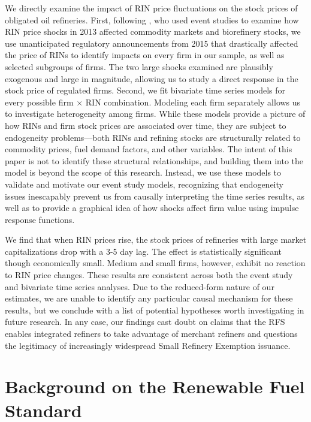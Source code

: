 \documentclass[11pt]{article}
\begin{document}
We directly examine the impact of RIN price fluctuations on the stock prices of obligated oil refineries. First, following \cite{Lade2018a}, who used event studies to examine how RIN price shocks in 2013 affected commodity markets and biorefinery stocks, we use unanticipated regulatory announcements from 2015 that drastically affected the price of RINs to identify impacts on every firm in our sample, as well as selected subgroups of firms. The two large shocks examined are plausibly exogenous and large in magnitude, allowing us to study a direct response in the stock price of regulated firms. Second, we fit bivariate time series models for every possible firm $\times$ RIN combination. Modeling each firm separately allows us to investigate heterogeneity among firms. While these models provide a picture of how RINs and firm stock prices are associated over time, they are subject to endogeneity problems---both RINs and refining stocks are structurally related to commodity prices, fuel demand factors, and other variables. The intent of this paper is not to identify these structural relationships, and building them into the model is beyond the scope of this research. Instead, we use these models to validate and motivate our event study models, recognizing that endogeneity issues inescapably prevent us from causally interpreting the time series results, as well as to provide a graphical idea of how shocks affect firm value using impulse response functions.

We find that when RIN prices rise, the stock prices of refineries with large market capitalizations drop with a 3-5 day lag. The effect is statistically significant though economically small. Medium and small firms, however, exhibit no reaction to RIN price changes. These results are consistent across both the event study and bivariate time series analyses. Due to the reduced-form nature of our estimates, we are unable to identify any particular causal mechanism for these results, but we conclude with a list of potential hypotheses worth investigating in future research. In any case, our findings cast doubt on claims that the RFS enables integrated refiners to take advantage of merchant refiners and questions the legitimacy of increasingly widespread Small Refinery Exemption issuance.

\section{Background on the Renewable Fuel Standard}
\end{document}
